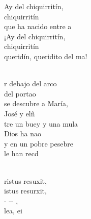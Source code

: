 \documentclass[12pt]{article}
\begin{document}
\begin{multicols*}{2}
\begin{cancion}[Chiquirritín][]%
	\begin{chorus}%
	Ay del chiquirritín,\\
chiquirritín\\
	que ha nacido entre a\\
¡Ay del chiquirritín, \\
chiquirritín\\
	queridín, queridito del ma!\\
	\end{chorus}%
	\jump\\
	r debajo del arco \\
	del portao\\
se descubre a María, \\
	José y elñ \\
\jump
	tre un buey y una mula\\
	Dios ha nao\\
y en un pobre pesebre \\
	le han recd\\
\end{cancion}%

\begin{cancion}%
	   \\
	ristus resuxit,\\
	istus resurxit,\\
	- -- , \\
	 lea, ei\\
\end{cancion}%


\end{multicols*}
\end{document}
